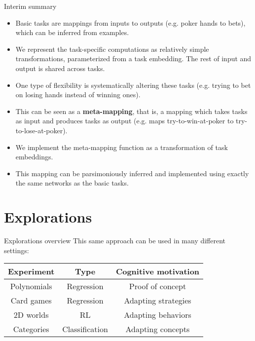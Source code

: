 \documentclass{beamer}
\begin{document}
\begin{frame}{Interim summary}
\begin{itemize}
\item Basic tasks are mappings from inputs to outputs (e.g. poker hands to bets), which can be inferred from examples.
\item We represent the task-specific computations as relatively simple transformations, parameterized from a task embedding. The rest of input and output is shared across tasks.
\item One type of flexibility is systematically altering these tasks (e.g. trying to bet on losing hands instead of winning ones).
\item This can be seen as a \textbf{meta-mapping}, that is, a mapping which takes tasks as input and produces tasks as output (e.g. maps try-to-win-at-poker to try-to-lose-at-poker).
\item We implement the meta-mapping function as a transformation of task embeddings.
\item This mapping can be parsimoniously inferred and implemented using exactly the same networks as the basic tasks.
\end{itemize}
\end{frame}

\section{Explorations}

\begin{frame}{Explorations overview}
This same approach can be used in many different settings: 
\begin{table}
\center
\begin{tabular}{|c|c|c|}
\hline
Experiment & Type & Cognitive motivation \\
\hline
\color{lightgray} Polynomials & \color{lightgray} Regression & \color{lightgray} Proof of concept \\
Card games & Regression & Adapting strategies \\
2D worlds & RL & Adapting behaviors \\
Categories & Classification & Adapting concepts \\
\hline
\end{tabular}
\end{table}
\end{frame}

\end{document}
